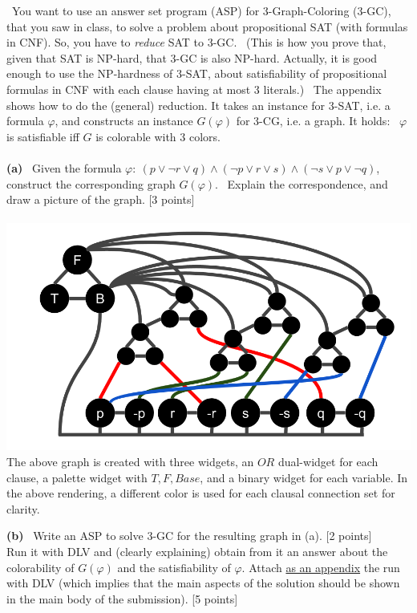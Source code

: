 \documentclass[12pt,fullpage]{article}
\begin{document}
\vspace{2mm}  \ You want to use an answer set program (ASP) for 3-Graph-Coloring (3-GC), that you saw in class, to solve a problem about propositional SAT (with formulas in CNF). So, you have to {\em reduce} SAT to 3-GC. \ (This is how you prove that, given that SAT is NP-hard, that 3-GC is also NP-hard. Actually, it is good enough to use the NP-hardness of 3-SAT, about satisfiability of propositional formulas in CNF with each clause having at most  3 literals.) \ The appendix shows how to do the (general) reduction. It takes an instance for 3-SAT, i.e. a formula $\varphi$,  and constructs an instance $G(\varphi)$ for 3-CG, i.e. a graph. It holds: \ $\varphi$ is satisfiable iff $G$ is colorable with 3 colors.\\
\\
{\bf (a)} \ Given the formula $\varphi\!: \ (p \vee \neg r \vee q) \wedge (\neg p \vee r \vee s) \wedge (\neg s \vee p \vee \neg q)$, construct the corresponding graph $G(\varphi)$. \ Explain the correspondence, and draw a picture of the graph. \hfill [3 points]\\

\vspace{2mm} \\
\includegraphics[width=\textwidth]{graph.png}
The above graph is created with three widgets, an $OR$ dual-widget for each clause, a palette widget with $T,F,Base$, and a binary widget for each variable. In the above rendering, a different color is used for each clausal connection set for clarity.

\vspace{2mm} {\bf (b)} \ Write an ASP to solve 3-GC for the resulting graph in (a). \hfill [2 points]\\
Run it with DLV and (clearly explaining) obtain  from it an answer about the colorability of $G(\varphi)$ and the satisfiability of $\varphi$.  Attach \underline{as an appendix} the run with DLV (which implies that the main aspects of the solution should be shown in the main body of the submission). \hfill [5 points]\\
\end{document}
